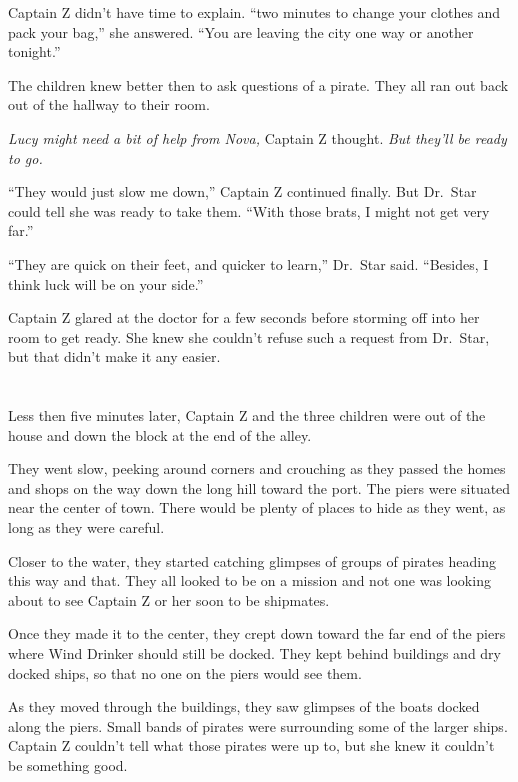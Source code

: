 \documentclass[12pt]{extbook}
\begin{document}
  Captain Z didn't have time to explain. \enquote{two minutes to change
  your clothes and pack your bag,} she answered. \enquote{You are leaving
  the city one way or another tonight.}
  
  The children knew better then to ask questions of a pirate. They all ran
  out back out of the hallway to their room.
  
  \emph{Lucy might need a bit of help from Nova,} Captain Z thought.
  \emph{But they'll be ready to go.}
  
  \enquote{They would just slow me down,} Captain Z continued finally. But
  Dr.~Star could tell she was ready to take them. \enquote{With those
  brats, I might not get very far.}
  
  \enquote{They are quick on their feet, and quicker to learn,} Dr.~Star
  said. \enquote{Besides, I think luck will be on your side.}
  
  Captain Z glared at the doctor for a few seconds before storming off
  into her room to get ready. She knew she couldn't refuse such a request
  from Dr.~Star, but that didn't make it any easier.
  
  \section{}\label{section-37}
  
  Less then five minutes later, Captain Z and the three children were out
  of the house and down the block at the end of the alley.
  
  They went slow, peeking around corners and crouching as they passed the
  homes and shops on the way down the long hill toward the port. The piers
  were situated near the center of town. There would be plenty of places
  to hide as they went, as long as they were careful.
  
  Closer to the water, they started catching glimpses of groups of pirates
  heading this way and that. They all looked to be on a mission and not
  one was looking about to see Captain Z or her soon to be shipmates.
  
  Once they made it to the center, they crept down toward the far end of
  the piers where Wind Drinker should still be docked. They kept behind
  buildings and dry docked ships, so that no one on the piers would see
  them.
  
  As they moved through the buildings, they saw glimpses of the boats
  docked along the piers. Small bands of pirates were surrounding some of
  the larger ships. Captain Z couldn't tell what those pirates were up to,
  but she knew it couldn't be something good.
  
\end{document}
